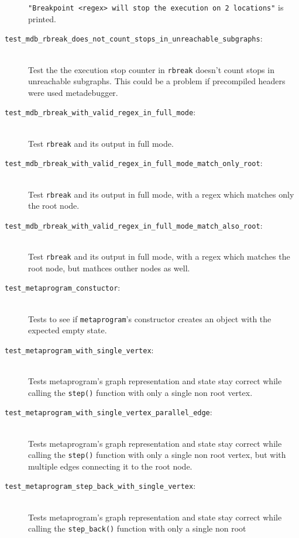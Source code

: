 \begin{description}
        \texttt{"Breakpoint <regex> will stop the execution on 2 locations"} is
        printed.
    \item[\texttt{test\_mdb\_rbreak\_does\_not\_count\_stops\_in\_unreachable\_subgraphs}:] \hfill \\
        Test the the execution stop counter in \texttt{rbreak} doesn't count
        stops in unreachable subgraphs. This could be a problem if precompiled
        headers were used metadebugger.
    \item[\texttt{test\_mdb\_rbreak\_with\_valid\_regex\_in\_full\_mode}:] \hfill \\
        Test \texttt{rbreak} and its output in full mode.
    \item[\texttt{test\_mdb\_rbreak\_with\_valid\_regex\_in\_full\_mode\_match\_only\_root}:] \hfill \\
        Test \texttt{rbreak} and its output in full mode, with a regex which
        matches only the root node.
    \item[\texttt{test\_mdb\_rbreak\_with\_valid\_regex\_in\_full\_mode\_match\_also\_root}:] \hfill \\
        Test \texttt{rbreak} and its output in full mode, with a regex which
        matches the root node, but mathces outher nodes as well.
    \item[\texttt{test\_metaprogram\_constuctor}:] \hfill \\
        Tests to see if \texttt{metaprogram}'s constructor creates an object
        with the expected empty state.
    \item[\texttt{test\_metaprogram\_with\_single\_vertex}:] \hfill \\
        Tests metaprogram's graph representation and state stay correct while
        calling the \texttt{step()} function with only a single non root
        vertex.
    \item[\texttt{test\_metaprogram\_with\_single\_vertex\_parallel\_edge}:] \hfill \\
        Tests metaprogram's graph representation and state stay correct while
        calling the \texttt{step()} function with only a single non root
        vertex, but with multiple edges connecting it to the root node.
    \item[\texttt{test\_metaprogram\_step\_back\_with\_single\_vertex}:] \hfill \\
        Tests metaprogram's graph representation and state stay correct while
        calling the \texttt{step\_back()} function with only a single non root

\end{description}
